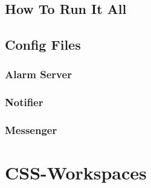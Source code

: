 \documentclass[amsmath,amssymb,notitlepage,11pt]{revtex4}
\begin{document}
\subsection{How To Run It All}
\subsection{Config Files}
\subsubsection{Alarm Server}
\subsubsection{Notifier}
\subsubsection{Messenger}

\section{CSS-Workspaces}



%
\end{document}
